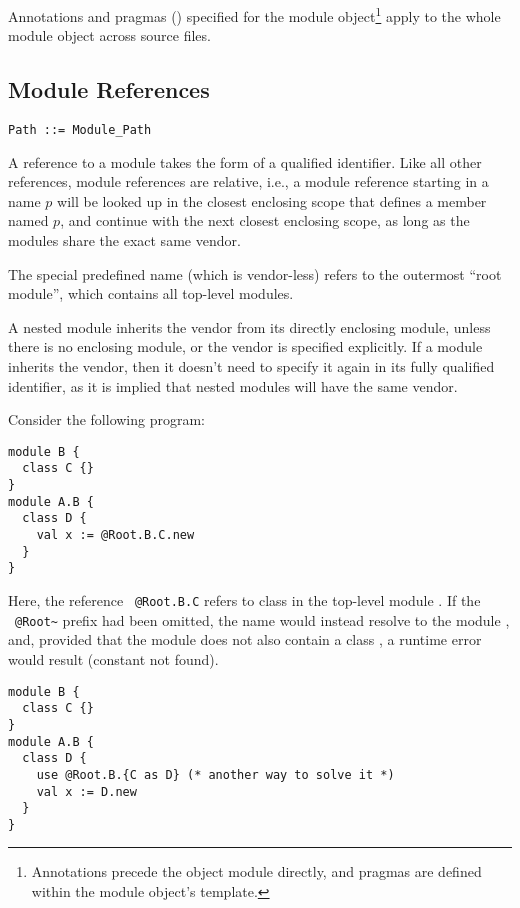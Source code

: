 Annotations and pragmas () specified for the module object\footnote{Annotations precede the object module directly, and pragmas are defined within the module object's template.} apply to the whole module object across source files. 






\subsection{Module References}
\label{sec:module-refs}

\syntax\begin{lstlisting}
Path ::= Module_Path
\end{lstlisting}

A reference to a module takes the form of a qualified identifier. Like all other references, module references are relative, i.e., a module reference starting in a name $p$ will be looked up in the closest enclosing scope that defines a member named $p$, and continue with the next closest enclosing scope, as long as the modules share the exact same vendor. 

The special predefined name  (which is vendor-less) refers to the outermost ``root module'', which contains all top-level modules. 

A nested module inherits the vendor from its directly enclosing module, unless there is no enclosing module, or the vendor is specified explicitly. If a module inherits the vendor, then it doesn't need to specify it again in its fully qualified identifier, as it is implied that nested modules will have the same vendor. 

\example Consider the following program:
\begin{lstlisting}
module B {
  class C {}
}
module A.B {
  class D {
    val x := @Root.B.C.new
  }
}
\end{lstlisting}
Here, the reference ~\lstinline!@Root.B.C! refers to class  in the top-level module . If the ~\lstinline!@Root~! prefix had been omitted, the name  would instead resolve to the module , and, provided that the module does not also contain a class , a runtime error would result (constant not found). 
\begin{lstlisting}
module B {
  class C {}
}
module A.B {
  class D {
    use @Root.B.{C as D} (* another way to solve it *)
    val x := D.new
  }
}
\end{lstlisting}





